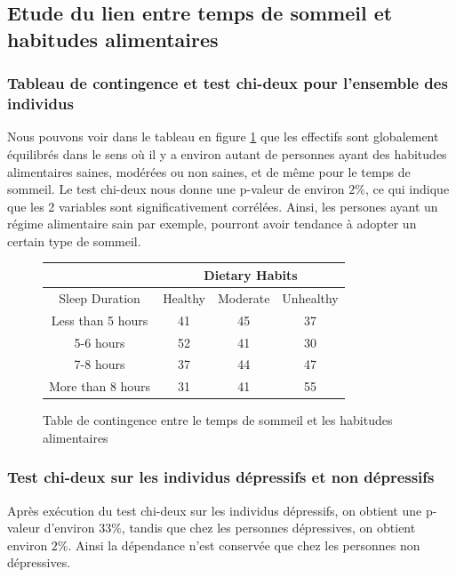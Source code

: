 \subsection{Etude du lien entre temps de sommeil et habitudes alimentaires}

\subsubsection{Tableau de contingence et test chi-deux pour l'ensemble des individus}

Nous pouvons voir dans le tableau en figure \ref{tab:contTableDietarySleepAll} que les effectifs sont globalement équilibrés dans le sens où il y a environ autant de personnes ayant des habitudes alimentaires saines, modérées ou non saines, et de même pour le temps de sommeil. 
Le test chi-deux nous donne une p-valeur de environ $ 2\%$, ce qui indique que les 2 variables sont significativement corrélées. Ainsi, les persones ayant un régime alimentaire sain par exemple, pourront avoir tendance à adopter un certain type de sommeil.

\begin{figure}[!h]
    \begin{center}
      \begin{tabular}{|c|c|c|c|}
        \hline 
        & \multicolumn{3}{|c|}{Dietary Habits}\\ 
        \hline
        Sleep Duration & Healthy & Moderate & Unhealthy\\
        \hline 
        Less than 5 hours & 41 & 45 & 37 \\ 
        \hline 
        5-6 hours & 52 & 41 & 30\\
        \hline 
        7-8 hours & 37 & 44 & 47\\
        \hline 
        More than 8 hours & 31 & 41 & 55\\
        \hline
      \end{tabular}
    \end{center}
    \caption{Table de contingence entre le temps de sommeil et les habitudes alimentaires}
    \label{tab:contTableDietarySleepAll}
\end{figure}  

\subsubsection{Test chi-deux sur les individus dépressifs et non dépressifs}

Après exécution du test chi-deux sur les individus dépressifs, on obtient une p-valeur d'environ $ 33\%$, tandis que chez les personnes dépressives, on obtient environ $ 2\%$. Ainsi la dépendance n'est conservée que chez les personnes non dépressives. 

